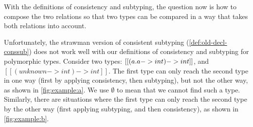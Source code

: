 With the definitions of consistency and subtyping, the question now is how to
compose the two relations so that two types can be compared in a way that takes
both relations into account.

Unfortunately, the strawman version of consistent subtyping
(\cref{def:old-decl-conssub}) does not work well with our definitions of
consistency and subtyping for polymorphic types. Consider two types: $[[ (\/a. a
-> int) -> int ]]$, and $[[ (unknown -> int) -> int ]]$. The first type can only
reach the second type in one way (first by applying consistency, then
subtyping), but not the other way, as shown in \cref{fig:example:a}. We use
$\emptyset$ to mean that we cannot find such a type. Similarly, there are
situations where the first type can only reach the second type by the other way
(first applying subtyping, and then consistency), as shown in
\cref{fig:example:b}.

